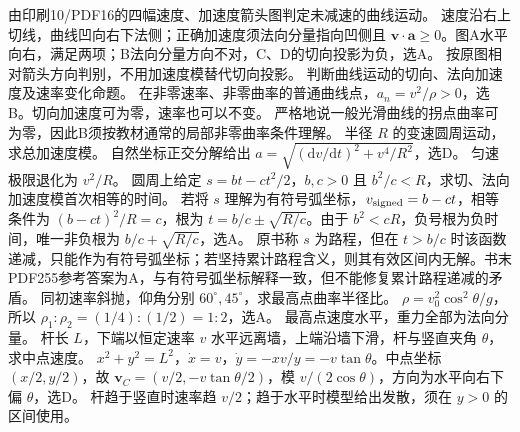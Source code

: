 \problemtext 由印刷10/PDF16的四幅速度、加速度箭头图判定未减速的曲线运动。
\workings 速度沿右上切线，曲线凹向右下法侧；正确加速度须法向分量指向凹侧且 $\bm v\cdot\bm a\ge0$。图A水平向右，满足两项；B法向分量方向不对，C、D的切向投影为负，选A。
\crosscheck 按原图相对箭头方向判别，不用加速度模替代切向投影。
\problemtext 判断曲线运动的切向、法向加速度及速率变化命题。
\workings 在非零速率、非零曲率的普通曲线点，$a_n=v^2/\rho>0$，选B。切向加速度可为零，速率也可以不变。
\crosscheck 严格地说一般光滑曲线的拐点曲率可为零，因此B须按教材通常的局部非零曲率条件理解。
\problemtext 半径 $R$ 的变速圆周运动，求总加速度模。
\workings 自然坐标正交分解给出 $a=\sqrt{(\mathrm dv/\mathrm dt)^2+v^4/R^2}$，选D。
\crosscheck 匀速极限退化为 $v^2/R$。
\problemtext 圆周上给定 $s=bt-ct^2/2$，$b,c>0$ 且 $b^2/c<R$，求切、法向加速度模首次相等的时间。
\workings 若将 $s$ 理解为有符号弧坐标，$v_{\rm signed}=b-ct$，相等条件为 $(b-ct)^2/R=c$，根为 $t=b/c\pm\sqrt{R/c}$。由于 $b^2<cR$，负号根为负时间，唯一非负根为 $b/c+\sqrt{R/c}$，选A。
\crosscheck 原书称 $s$ 为路程，但在 $t>b/c$ 时该函数递减，只能作为有符号弧坐标；若坚持累计路程含义，则其有效区间内无解。书末PDF255参考答案为A，与有符号弧坐标解释一致，但不能修复累计路程递减的矛盾。
\problemtext 同初速率斜抛，仰角分别 $60^\circ,45^\circ$，求最高点曲率半径比。
\workings $\rho=v_0^2\cos^2\theta/g$，所以 $\rho_1:\rho_2=(1/4):(1/2)=1:2$，选A。
\crosscheck 最高点速度水平，重力全部为法向分量。
\problemtext 杆长 $L$，下端以恒定速率 $v$ 水平远离墙，上端沿墙下滑，杆与竖直夹角 $\theta$，求中点速度。
\workings $x^2+y^2=L^2$，$\dot x=v$，$\dot y=-xv/y=-v\tan\theta$。中点坐标 $(x/2,y/2)$，故 $\bm v_C=(v/2,-v\tan\theta/2)$，模 $v/(2\cos\theta)$，方向为水平向右下偏 $\theta$，选D。
\crosscheck 杆趋于竖直时速率趋 $v/2$；趋于水平时模型给出发散，须在 $y>0$ 的区间使用。

